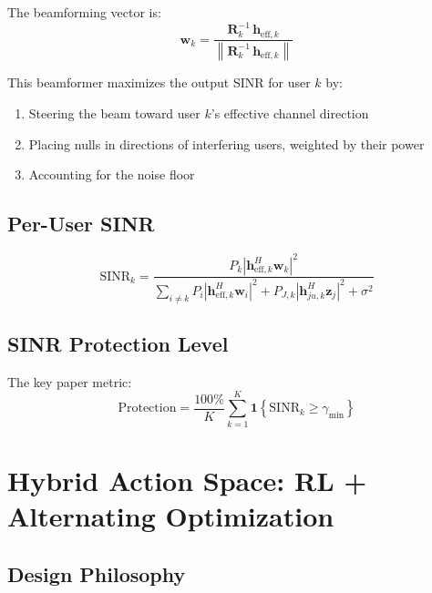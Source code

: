 \documentclass[11pt,a4paper]{article}
\begin{document}
The beamforming vector is:
\begin{equation}\label{eq:mvdr}
\boxed{\mathbf{w}_k = \frac{\mathbf{R}_k^{-1}\, \mathbf{h}_{\mathrm{eff},k}}{\left\|\mathbf{R}_k^{-1}\, \mathbf{h}_{\mathrm{eff},k}\right\|}}
\end{equation}

This beamformer maximizes the output SINR for user $k$ by:
\begin{enumerate}[nosep]
    \item Steering the beam toward user $k$'s effective channel direction
    \item Placing nulls in directions of interfering users, weighted by their power
    \item Accounting for the noise floor
\end{enumerate}

\subsection{Per-User SINR}

\begin{equation}\label{eq:sinr}
\mathrm{SINR}_k = \frac{P_k \left|\mathbf{h}_{\mathrm{eff},k}^H \mathbf{w}_k\right|^2}{\displaystyle\sum_{i \neq k} P_i \left|\mathbf{h}_{\mathrm{eff},k}^H \mathbf{w}_i\right|^2 + P_{J,k} \left|\mathbf{h}_{ju,k}^H \mathbf{z}_{j}\right|^2 + \sigma^2}
\end{equation}

\subsection{SINR Protection Level}

The key paper metric:
\begin{equation}
\text{Protection} = \frac{100\%}{K} \sum_{k=1}^{K} \mathbf{1}\!\left\{\mathrm{SINR}_k \geq \gamma_{\min}\right\}
\end{equation}


\section{Hybrid Action Space: RL + Alternating Optimization}

\subsection{Design Philosophy}
\end{document}
